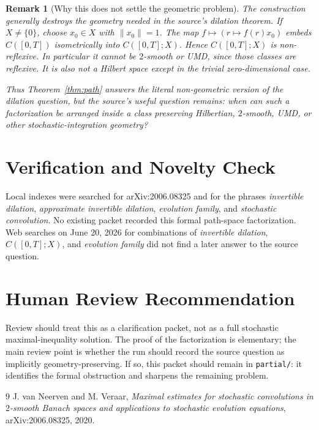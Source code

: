 \documentclass[11pt]{article}
\newtheorem{remark}{Remark}
\begin{document}
\begin{remark}[Why this does not settle the geometric problem]
The construction generally destroys the geometry needed in the source's
dilation theorem. If \(X\neq\{0\}\), choose \(x_0\in X\) with \(\|x_0\|=1\).
The map \(f\mapsto (r\mapsto f(r)x_0)\) embeds \(C([0,T])\) isometrically into
\(C([0,T];X)\). Hence \(C([0,T];X)\) is non-reflexive. In particular it cannot
be \(2\)-smooth or UMD, since those classes are reflexive. It is also not a
Hilbert space except in the trivial zero-dimensional case.

Thus Theorem~\ref{thm:path} answers the literal non-geometric version of the
dilation question, but the source's useful question remains: when can such a
factorization be arranged inside a class preserving Hilbertian, \(2\)-smooth,
UMD, or other stochastic-integration geometry?
\end{remark}

\section*{Verification and Novelty Check}

Local indexes were searched for arXiv:2006.08325 and for the phrases
\emph{invertible dilation}, \emph{approximate invertible dilation},
\emph{evolution family}, and \emph{stochastic convolution}. No existing packet
recorded this formal path-space factorization. Web searches on June 20, 2026
for combinations of \emph{invertible dilation}, \emph{\(C([0,T];X)\)}, and
\emph{evolution family} did not find a later answer to the source question.

\section*{Human Review Recommendation}

Review should treat this as a clarification packet, not as a full stochastic
maximal-inequality solution. The proof of the factorization is elementary; the
main review point is whether the run should record the source question as
implicitly geometry-preserving. If so, this packet should remain in
\texttt{partial/}: it identifies the formal obstruction and sharpens the
remaining problem.

\begin{thebibliography}{9}
J. van Neerven and M. Veraar,
\emph{Maximal estimates for stochastic convolutions in \(2\)-smooth Banach
spaces and applications to stochastic evolution equations},
arXiv:2006.08325, 2020.
\end{thebibliography}
\end{document}
